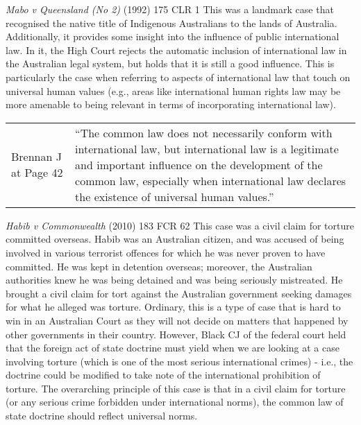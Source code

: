 \begin{casedetails}{\textit{Mabo v Queensland (No 2)} (1992) 175 CLR 1}\label{case: Mabo}
    \flushleft
    This was a landmark case that recognised the native title of Indigenous Australians to the lands of Australia. Additionally, it provides some insight into the influence of public international law. In it, the High Court rejects the automatic inclusion of international law in the Australian legal system, but holds that it is still a good influence. This is particularly the case when referring to aspects of international law that touch on universal human values (e.g., areas like international human rights law may be more amenable to being relevant in terms of incorporating international law).

    \begin{longtable}{p{}|>{\raggedright\arraybackslash}p{}}
        Brennan J at Page 42 & ``The common law does not necessarily conform with international law, but international law is a legitimate and important influence on the development of the common law, especially when international law declares the existence of universal human values.''
    \end{longtable}
\end{casedetails}

\begin{casedetails}{\textit{Habib v Commonwealth} (2010) 183 FCR 62}\label{case: Habib v Commonwealth}
    \flushleft
    This case was a civil claim for torture committed overseas. Habib was an Australian citizen, and was accused of being involved in various terrorist offences for which he was never proven to have committed. He was kept in detention overseas; moreover, the Australian authorities knew he was being detained and was being seriously mistreated. He brought a civil claim for tort against the Australian government seeking damages for what he alleged was torture. Ordinary, this is a type of case that is hard to win in an Australian Court as they will not decide on matters that happened by other governments in their country. However, Black CJ of the federal court held that the foreign act of state doctrine must yield when we are looking at a case involving torture (which is one of the most serious international crimes) - i.e., the doctrine could be modified to take note of the international prohibition of torture. The overarching principle of this case is that in a civil claim for torture (or any serious crime forbidden under international norms), the common law of state doctrine should reflect universal norms.
\end{casedetails}

